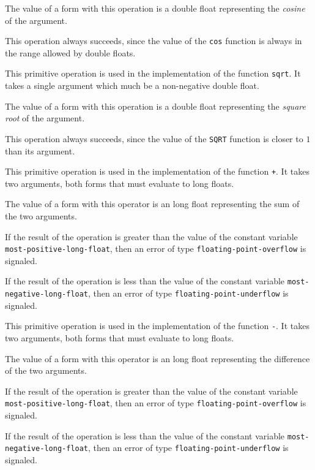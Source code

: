 The value of a form with this operation is a double float representing
the \emph{cosine} of the argument.

This operation always succeeds, since the value of the \texttt{cos}
function is always in the range allowed by double floats.


This primitive operation is used in the implementation of the
\commonlisp{} function \texttt{sqrt}.  It takes a single argument which
much be a non-negative double float.

The value of a form with this operation is a double float representing
the \emph{square root} of the argument.

This operation always succeeds, since the value of the \texttt{SQRT}
function is closer to $1$ than its argument.


This primitive operation is used in the implementation of the
\commonlisp{} function \texttt{+}.  It takes two arguments, both forms
that must evaluate to long floats.

The value of a form with this operator is an long float
representing the sum of the two arguments.

If the result of the operation is greater than the value of the
constant variable \texttt{most-positive-long-float}, then an error of
type \texttt{floating-point-overflow} is signaled.

If the result of the operation is less than the value of the
constant variable \texttt{most-negative-long-float}, then an error of
type \texttt{floating-point-underflow} is signaled.


This primitive operation is used in the implementation of the
\commonlisp{} function \texttt{-}.  It takes two arguments, both forms
that must evaluate to long floats.

The value of a form with this operator is an long float
representing the difference of the two arguments.

If the result of the operation is greater than the value of the
constant variable \texttt{most-positive-long-float}, then an error of
type \texttt{floating-point-overflow} is signaled.

If the result of the operation is less than the value of the
constant variable \texttt{most-negative-long-float}, then an error of
type \texttt{floating-point-underflow} is signaled.

